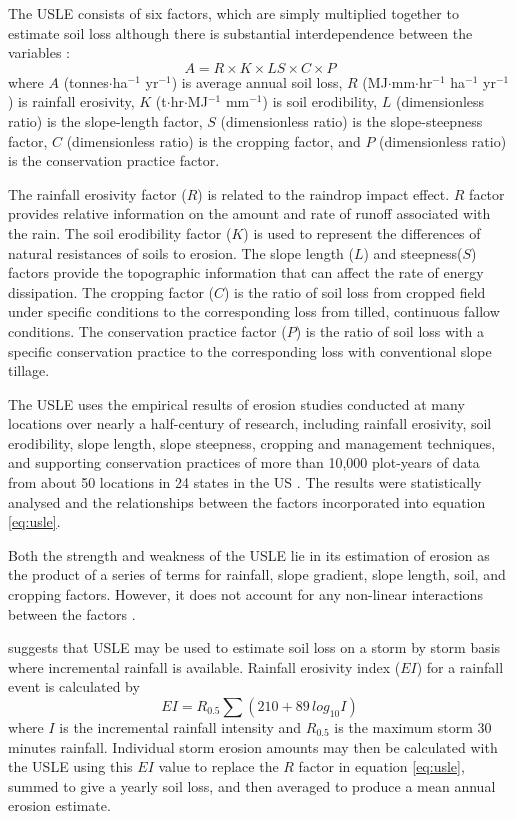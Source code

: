 The USLE consists of six factors, which are simply multiplied together to
estimate soil loss although there is substantial interdependence between the
variables \citep{wischmeier1978-537}:
\begin{equation}
\label{eq:usle}
  A = R \times K \times LS \times C \times P
\end{equation}
where $A$ (tonnes$\cdot$ha$^{-1}$ yr$^{-1}$) is average annual soil loss, $R$
(MJ$\cdot$mm$\cdot$hr$^{-1}$ ha$^{-1}$ yr$^{-1}$) is rainfall erosivity, $K$
(t$\cdot$hr$\cdot$MJ$^{-1}$ mm$^{-1}$) is soil erodibility, $L$ (dimensionless
ratio) is the slope-length factor, $S$ (dimensionless ratio) is the
slope-steepness factor, $C$ (dimensionless ratio) is the cropping factor, and
$P$ (dimensionless ratio) is the conservation practice factor.

%
The rainfall erosivity factor ($R$) is related to the raindrop impact effect.
$R$ factor provides relative information on the amount and rate of runoff
associated with the rain. The soil erodibility factor ($K$) is used to represent
the differences of natural resistances of soils to erosion. The slope length
($L$) and steepness($S$) factors provide the topographic information that can
affect the rate of energy dissipation. The cropping factor ($C$) is the ratio of
soil loss from cropped field under specific conditions to the corresponding loss
from tilled, continuous fallow conditions. The conservation practice factor
($P$) is the ratio of soil loss with a specific conservation practice to the
corresponding loss with conventional slope tillage.
%

The USLE uses the empirical results of erosion studies conducted at many
locations over nearly a half-century of research, including rainfall erosivity,
soil erodibility, slope length, slope steepness, cropping and management
techniques, and supporting conservation practices of more than 10,000 plot-years
of data from about 50 locations in 24 states in the US
\citep{wischmeier1978-537}. The results were statistically analysed and the
relationships between the factors incorporated into equation \ref{eq:usle}.

Both the strength and weakness of the USLE lie in its estimation of erosion as
the product of a series of terms for rainfall, slope gradient, slope length,
soil, and cropping factors. However, it does not account for any non-linear
interactions between the factors \citep{wischmeier1978-537,meyer1984-99}.

\citet{nicks1998-377} suggests that USLE may be used to estimate soil loss on a
storm by storm basis where incremental rainfall is available. Rainfall erosivity
index ($EI$) for a rainfall event is calculated by
\begin{equation}
\label{eq:usleerosivityindex}
  EI=R_{0.5} \sum(210+89\,log_{10} I)
\end{equation}
where $I$ is the incremental rainfall intensity and $R_{0.5}$ is the maximum
storm 30 minutes rainfall.
Individual storm erosion amounts may then be calculated with the USLE using this
$EI$ value to replace the $R$ factor in equation \ref{eq:usle}, summed to give a
yearly soil loss, and then averaged to produce a mean annual erosion estimate.

